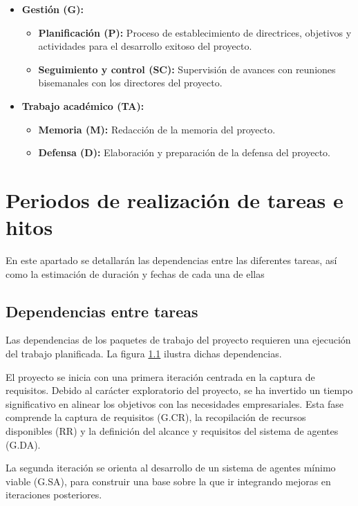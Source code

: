 \begin{itemize}
\begin{itemize}
\begin{itemize}
        \end{itemize}
    \end{itemize}
  \item\textbf{Gestión (G): }
    \begin{itemize}
      \item\textbf{Planificación (P): }Proceso de establecimiento de directrices, objetivos y actividades para el desarrollo exitoso del proyecto.
      \item\textbf{Seguimiento y control (SC): }Supervisión de avances con reuniones bisemanales con los directores del proyecto.
    \end{itemize}
  \item\textbf{Trabajo académico (TA): }
    \begin{itemize}
      \item\textbf{Memoria (M): }Redacción de la memoria del proyecto. 
      \item\textbf{Defensa (D): }Elaboración y preparación de la defensa del proyecto.
    \end{itemize}
\end{itemize}

\section{Periodos de realización de tareas e hitos}
En este apartado se detallarán las dependencias entre las diferentes tareas, así como la estimación de duración y fechas de cada una de ellas

\subsection{Dependencias entre tareas}
Las dependencias de los paquetes de trabajo del proyecto requieren una ejecución del trabajo planificada. La figura \ref{} ilustra dichas dependencias.


El proyecto se inicia con una primera iteración centrada en la captura de requisitos. Debido al carácter exploratorio del proyecto, se ha invertido un tiempo significativo en alinear los objetivos con las necesidades empresariales. Esta fase comprende la captura de requisitos (G.CR), la recopilación de recursos disponibles (RR) y la definición del alcance y requisitos del sistema de agentes (G.DA).

La segunda iteración se orienta al desarrollo de un sistema de agentes mínimo viable (G.SA), para construir una base sobre la que ir integrando mejoras en iteraciones posteriores. 

